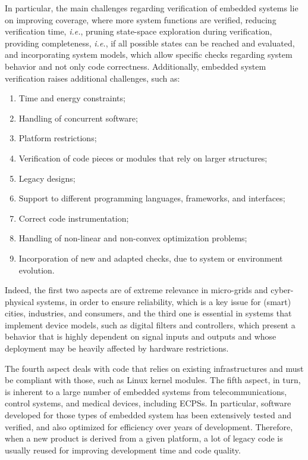 \documentclass[format=acmsmall, review=false, screen=true]{acmart}
\begin{document}
In particular, the main challenges regarding verification of embedded systems lie on improving coverage, where more system functions are verified, reducing verification time, {\it i.e.}, pruning state-space exploration during verification, providing completeness, {\it i.e.},  if all possible states can be reached and evaluated, and incorporating system models, which allow specific checks regarding system behavior and not only code correctness. Additionally, embedded system verification raises additional challenges, such as:
%
\begin{enumerate}
	\item Time and energy constraints;
	\item Handling of concurrent software;
	\item Platform restrictions;
	\item Verification of code pieces or modules that rely on larger structures;
	\item Legacy designs; %
	\item Support to different programming languages, frameworks, and interfaces;
	\item Correct code instrumentation;
	\item Handling of non-linear and non-convex optimization problems;
	\item Incorporation of new and adapted checks, due to system or environment evolution.
\end{enumerate}

Indeed, the first two aspects are of extreme relevance in micro-grids and cyber-physical systems, in order to ensure reliability, which is a key issue for (smart) cities, industries, and consumers, and the third one is essential in systems that implement device models, such as digital filters and controllers, which present a behavior that is highly dependent on signal inputs and outputs and whose deployment may be heavily affected by hardware restrictions. 

The fourth aspect deals with code that relies on existing infrastructures and must be compliant with those, such as Linux kernel modules. The fifth aspect, in turn, is inherent to a large number of embedded systems from  telecommunications, control systems, and medical devices, including ECPSs. In particular, software developed for those types of embedded system has been extensively tested and verified, and also optimized for efficiency over years of development. Therefore, when a new product is derived from a given platform, a lot of legacy code is usually reused for improving development time and code quality. 
\end{document}
